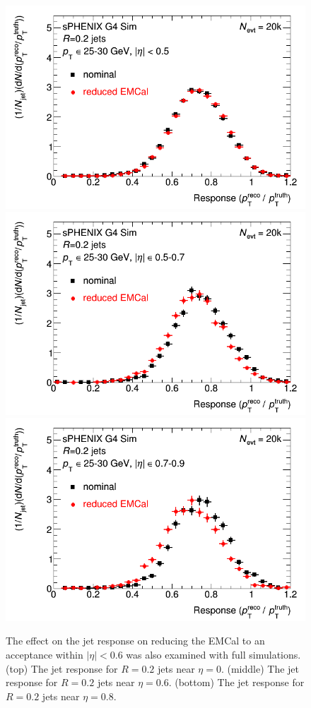 \begin{figure}[hbt]
  \centering
  \includegraphics[width=0.5\linewidth]{figs/jet_response_reduced_emcal_eta_0} \\
  \includegraphics[width=0.5\linewidth]{figs/jet_response_reduced_emcal_eta_05} \\
  \includegraphics[width=0.5\linewidth]{figs/jet_response_reduced_emcal_eta_07}
  \caption{The effect on the jet response on reducing the EMCal to an
    acceptance within $|\eta|<0.6$ was also examined with full \geant
    simulations.  (top) The jet response for $R = 0.2$ jets near $\eta
  = 0$. (middle) The jet response for $R = 0.2$ jets near $\eta
  = 0.6$. (bottom) The jet response for $R = 0.2$ jets near $\eta
  = 0.8$.}
  \label{fig:jet_response_reduced_emcal}
\end{figure}


